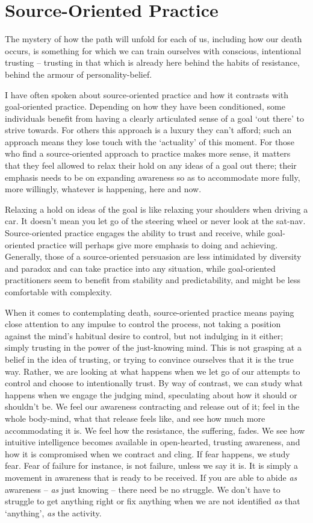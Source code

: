 \section{Source-Oriented Practice}

The mystery of how the path will unfold for each of us, including how
our death occurs, is something for which we can train ourselves with
conscious, intentional trusting – trusting in that which is already here
behind the habits of resistance, behind the armour of
personality-belief.

I have often spoken about source-oriented practice and how it contrasts
with goal-oriented practice. Depending on how they have been
conditioned, some individuals benefit from having a clearly articulated
sense of a goal ‘out there’ to strive towards. For others this approach
is a luxury they can’t afford; such an approach means they lose touch
with the ‘actuality’ of this moment. For those who find a
source-oriented approach to practice makes more sense, it matters that
they feel allowed to relax their hold on any ideas of a goal out there;
their emphasis needs to be on expanding awareness so as to accommodate
more fully, more willingly, whatever is happening, here and now.

Relaxing a hold on ideas of the goal is like relaxing your shoulders
when driving a car. It doesn’t mean you let go of the steering wheel or
never look at the sat-nav. Source-oriented practice engages the ability
to trust and receive, while goal-oriented practice will perhaps give
more emphasis to doing and achieving. Generally, those of a
source-oriented persuasion are less intimidated by diversity and paradox
and can take practice into any situation, while goal-oriented
practitioners seem to benefit from stability and predictability, and
might be less comfortable with complexity.

When it comes to contemplating death, source-oriented practice means
paying close attention to any impulse to control the process, not taking
a position against the mind’s habitual desire to control, but not
indulging in it either; simply trusting in the power of the just-knowing
mind. This is not grasping at a belief in the idea of trusting, or
trying to convince ourselves that it is the true way. Rather, we are
looking at what happens when we let go of our attempts to control and
choose to intentionally trust. By way of contrast, we can study what
happens when we engage the judging mind, speculating about how it should
or shouldn’t be. We feel our awareness contracting and release out of
it; feel in the whole body-mind, what that release feels like, and see
how much more accommodating it is. We feel how the resistance, the
suffering, fades. We see how intuitive intelligence becomes available in
open-hearted, trusting awareness, and how it is compromised when we
contract and cling. If fear happens, we study fear. Fear of failure for
instance, is not failure, unless we say it is. It is simply a movement
in awareness that is ready to be received. If you are able to abide \emph{as}
awareness – \emph{as} just knowing – there need be no struggle. We don’t have
to struggle to get anything right or fix anything when we are not
identified \emph{as} that ‘anything’, \emph{as} the activity.

